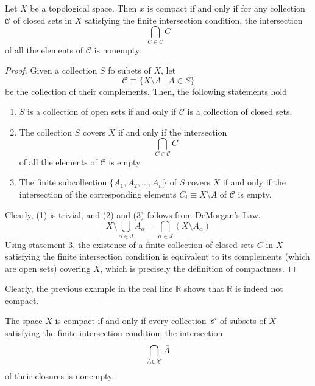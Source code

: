   \begin{theorem}
    Let $X$ be a topological space. Then $x$ is compact if and only if for any collection $\mathcal{C}$ of closed sets in $X$ satisfying the finite intersection condition, the intersection 
    \begin{equation}
      \bigcap_{C \in \mathcal{C}} C
    \end{equation}
    of all the elements of $\mathcal{C}$ is nonempty. 
  \end{theorem}
  \begin{proof}
    Given a collection $S$ fo subets of $X$, let 
    \begin{equation}
      \mathcal{C} \equiv \{X \setminus A \; | \; A \in S\}
    \end{equation}
    be the collection of their complements. Then, the following statements hold 
    \begin{enumerate}
      \item $S$ is a collection of open sets if and only if $\mathcal{C}$ is a collection of closed sets. 
      \item The collection $S$ covers $X$ if and only if the intersection 
      \begin{equation}
        \bigcap_{C \in \mathcal{C}} C
      \end{equation}
      of all the elements of $\mathcal{C}$ is empty. 

      \item The finite subcollection $\{A_1, A_2, \ldots , A_n\}$ of $S$ covers $X$ if and only if the intersection of the corresponding elements $C_i \equiv X \setminus A$ of $\mathcal{C}$ is empty. 
    \end{enumerate}
    Clearly, (1) is trivial, and (2) and (3) follows from DeMorgan's Law. 
    \begin{equation}
      X \setminus \bigcup_{\alpha \in J} A_\alpha = \bigcap_{\alpha \in J} (X \setminus A_\alpha)
    \end{equation}
    Using statement 3, the existence of a finite collection of closed sets $C$ in $X$ satisfying the finite intersection condition is equivalent to its complements (which are open sets) covering $X$, which is precisely the definition of compactness. 
  \end{proof}

  Clearly, the previous example in the real line $\mathbb{R}$ shows that $\mathbb{R}$ is indeed not compact. 

  \begin{corollary}
    The space $X$ is compact if and only if every collection $\operatorname{\mathscr{C}}$ of subsets of $X$ satisfying the finite intersection condition, the intersection 
    \begin{equation}
      \bigcap_{A \in \operatorname{\mathscr{C}}} \bar{A}
    \end{equation}
    of their closures is nonempty. 
  \end{corollary}

